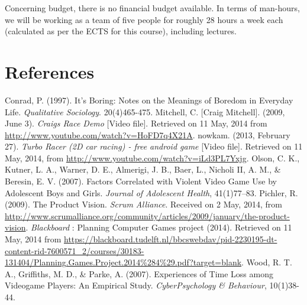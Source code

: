 \documentclass[11pt,twoside,a4paper]{article}
\begin{document}
Concerning budget, there is no financial budget available. In terms of man-hours, we will be working as a team of five people for roughly 28 hours a week each (calculated as per the ECTS for this course), including lectures.


\clearpage

\section*{References}

Conrad, P. (1997). It's Boring: Notes on the Meanings of Boredom in Everyday Life. \textit{Qualitative Sociology}. 20(4)465-475.
\newline \newline
Mitchell, C. [Craig Mitchell]. (2009, June 3). \textit{Craigs Race Demo} [Video file]. Retrieved on 11 May, 2014 from \url{http://www.youtube.com/watch?v=HoFD7q4X21A}.
\newline \newline
nowkam. (2013, February 27). \textit{Turbo Racer (2D car racing) - free android game} [Video file]. Retrieved on 11 May, 2014, from \url{http://www.youtube.com/watch?v=iLd3PL7Yxjg}.
\newline \newline
Olson, C. K., Kutner, L. A., Warner, D. E., Almerigi, J. B., Baer, L., Nicholi II, A. M., \& Beresin, E. V. (2007). Factors Correlated with Violent Video Game Use by Adolescent Boys and Girls. \textit{Journal of Adolescent Health}, 41(1)77–83.
\newline \newline
Pichler, R. (2009). The Product Vision. \textit{Scrum Alliance}. Received on 2 May, 2014, from \url{http://www.scrumalliance.org/community/articles/2009/january/the-product-vision}.
\newline \newline
\textit{Blackboard} : Planning Computer Games project (2014). Retrieved on 11 May, 2014 from \url{https://blackboard.tudelft.nl/bbcswebdav/pid-2230195-dt-content-rid-7600571_2/courses/30183-131404/Planning.Games.Project.2014%284%29.pdf?target=blank}.
\newline \newline
Wood, R. T. A., Griffiths, M. D., \& Parke, A. (2007). Experiences of Time Loss among Videogame Players: An Empirical Study. \textit{CyberPsychology \& Behaviour}, 10(1)38-44.
\end{document}
